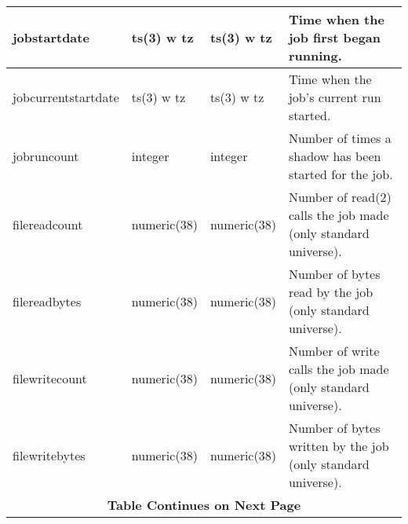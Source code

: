 \begin{center}
\begin{tabular}{|l|l|l|p{2.6in}|}
    jobstartdate & ts(3) w tz & ts(3) w tz & Time when the job first began running.\\ \hline
    jobcurrentstartdate & ts(3) w tz & ts(3) w tz & Time when the job's current run started.\\ \hline
    jobruncount & integer & integer & Number of times a shadow has been started for the job.\\ \hline
    filereadcount & numeric(38) & numeric(38) & Number of read(2) calls the job made (only standard universe).\\ \hline
    filereadbytes & numeric(38) & numeric(38) & Number of bytes read by the job (only standard universe).\\ \hline
    filewritecount & numeric(38) & numeric(38) & Number of write calls the job made (only standard universe).\\ \hline
    filewritebytes & numeric(38) & numeric(38) & Number of bytes written by the job (only standard universe).\\ \hline
    \multicolumn{4}{|c|}{\textbf{Table Continues on Next Page}}\\ \hline
  \end{tabular}
\vspace{24pt}


\end{center}
